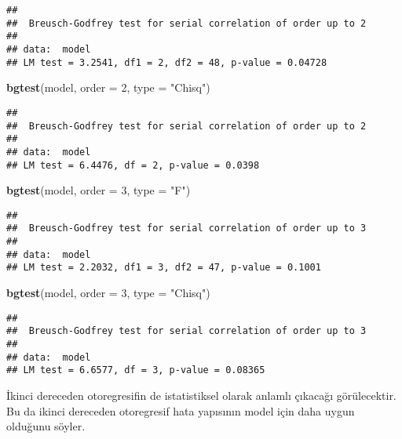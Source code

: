 \documentclass[
]{book}
\newenvironment{Shaded}{\begin{snugshade}}{\end{snugshade}}
\newcommand{\DataTypeTok}[1]{\textcolor[rgb]{0.13,0.29,0.53}{#1}}
\newcommand{\DecValTok}[1]{\textcolor[rgb]{0.00,0.00,0.81}{#1}}
\newcommand{\KeywordTok}[1]{\textcolor[rgb]{0.13,0.29,0.53}{\textbf{#1}}}
\newcommand{\NormalTok}[1]{#1}
\newcommand{\StringTok}[1]{\textcolor[rgb]{0.31,0.60,0.02}{#1}}
\begin{document}
\begin{verbatim}
## 
##  Breusch-Godfrey test for serial correlation of order up to 2
## 
## data:  model
## LM test = 3.2541, df1 = 2, df2 = 48, p-value = 0.04728
\end{verbatim}

\begin{Shaded}
\begin{Highlighting}[]
\KeywordTok{bgtest}\NormalTok{(model, }\DataTypeTok{order =} \DecValTok{2}\NormalTok{, }\DataTypeTok{type =} \StringTok{"Chisq"}\NormalTok{)}
\end{Highlighting}
\end{Shaded}

\begin{verbatim}
## 
##  Breusch-Godfrey test for serial correlation of order up to 2
## 
## data:  model
## LM test = 6.4476, df = 2, p-value = 0.0398
\end{verbatim}

\begin{Shaded}
\begin{Highlighting}[]
\KeywordTok{bgtest}\NormalTok{(model, }\DataTypeTok{order =} \DecValTok{3}\NormalTok{, }\DataTypeTok{type =} \StringTok{"F"}\NormalTok{)}
\end{Highlighting}
\end{Shaded}

\begin{verbatim}
## 
##  Breusch-Godfrey test for serial correlation of order up to 3
## 
## data:  model
## LM test = 2.2032, df1 = 3, df2 = 47, p-value = 0.1001
\end{verbatim}

\begin{Shaded}
\begin{Highlighting}[]
\KeywordTok{bgtest}\NormalTok{(model, }\DataTypeTok{order =} \DecValTok{3}\NormalTok{, }\DataTypeTok{type =} \StringTok{"Chisq"}\NormalTok{)}
\end{Highlighting}
\end{Shaded}

\begin{verbatim}
## 
##  Breusch-Godfrey test for serial correlation of order up to 3
## 
## data:  model
## LM test = 6.6577, df = 3, p-value = 0.08365
\end{verbatim}

İkinci dereceden otoregresifin de istatistiksel olarak anlamlı çıkacağı görülecektir. Bu da ikinci dereceden otoregresif hata yapısının model için daha uygun olduğunu söyler.
\end{document}
